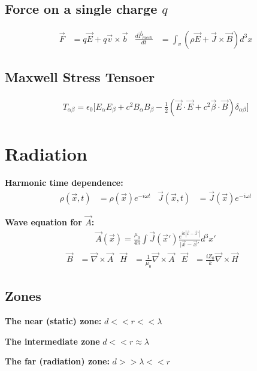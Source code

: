 \documentclass[a4paper, 11pt, landscape]{article}
\begin{document}
\begin{multicols*}{3}
\subsection{Force on a single charge $q$}
\begin{compactenum}
    \begin{align*}
   \vec{F} &= q\vec{E} + q\vec{v} \times \vec{b} & \frac{d\vec{P}_{mech}}{dt} &= \int_{v} (\rho\vec{E} + \vec{J} \times \vec{B}) d^{3}x
    \end{align*}
\end{compactenum}

\subsection{Maxwell Stress Tensoer}
\begin{compactenum}
    \begin{align*}
    T_{\alpha \beta} = \epsilon_{0} \Bigg[E_{\alpha}E_{\beta} + c^{2}B_{\alpha}B_{\beta} - \frac{1}{2}(\vec{E} \cdot \vec{E} + c^{2}\vec{\beta} \cdot \vec{B}) \delta_{\alpha \beta}\Bigg]
    \end{align*}
\end{compactenum}

\section{Radiation}
\begin{compactenum}
\textbf{Harmonic time dependence:} 
    \begin{align*}
    \rho(\vec{x}, t) &= \rho(\vec{x})e^{-i\omega t} & \vec{J}(\vec{x}, t) &= \vec{J}(\vec{x})e^{-i\omega t}
    \end{align*}
    \item \textbf{Wave equation for $\vec{A}$:} 
    \begin{align*}
    \vec{A}(\vec{x}) = \frac{\mu_{0}}{4 \pi} \int \vec{J}(\vec{x}') \frac{e^{ik|\vec{x} - \vec{x}'|}}{|\vec{x} - \vec{x}'} d^{3}x'
    \end{align*}
    \begin{align*}
    \vec{B} &= \vec{\nabla} \times \vec{A} &
    \vec{H} &= \frac{1}{\mu_{0}} \vec{\nabla} \times \vec{A} &
    \vec{E} &= \frac{i Z_{0}}{k} \vec{\nabla} \times \vec{H} &
    \end{align*}
\end{compactenum}

\subsection{Zones}
\begin{compactenum}
    \item \textbf{The near (static) zone:} $d << r << \lambda$
    \item \textbf{The intermediate zone} $d << r \approx \lambda$
    \item \textbf{The far (radiation) zone:} $d >> \lambda << r$
\end{compactenum}


\end{multicols*}
\end{document}

